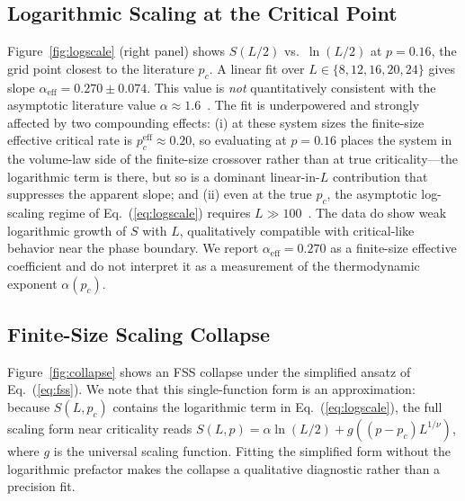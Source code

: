 \documentclass[twocolumn,prl,aps,floatfix]{revtex4-2}
\begin{document}
\subsection{Logarithmic Scaling at the Critical Point}
\label{sec:logscaling}

Figure~\ref{fig:logscale} (right panel) shows $S(L/2)$ vs.\ $\ln(L/2)$ at
$p = 0.16$, the grid point closest to the literature $p_c$.
A linear fit over $L \in \{8, 12, 16, 20, 24\}$ gives slope
$\alpha_{\mathrm{eff}} = 0.270 \pm 0.074$.
This value is \textit{not} quantitatively consistent with the asymptotic literature
value $\alpha \approx 1.6$~\cite{Li2019}.
The fit is underpowered and strongly affected by two compounding effects:
(i) at these system sizes the finite-size effective critical rate is
$p_c^{\mathrm{eff}} \approx 0.20$, so evaluating at $p = 0.16$ places the
system in the volume-law side of the finite-size crossover rather than at true
criticality---the logarithmic term is there, but so is a dominant linear-in-$L$
contribution that suppresses the apparent slope; and (ii) even at the true $p_c$,
the asymptotic log-scaling regime of Eq.~(\ref{eq:logscale}) requires
$L \gg 100$~\cite{Zabalo2020}.
The data do show weak logarithmic growth of $S$ with $L$, qualitatively
compatible with critical-like behavior near the phase boundary.
We report $\alpha_{\mathrm{eff}} = 0.270$ as a finite-size effective coefficient
and do not interpret it as a measurement of the thermodynamic exponent
$\alpha(p_c)$.

\subsection{Finite-Size Scaling Collapse}

Figure~\ref{fig:collapse} shows an FSS collapse under the simplified ansatz of
Eq.~(\ref{eq:fss}).
We note that this single-function form is an approximation: because $S(L,p_c)$
contains the logarithmic term in Eq.~(\ref{eq:logscale}), the full scaling form
near criticality reads
$S(L,p) = \alpha\ln(L/2) + g\!\left((p-p_c)L^{1/\nu}\right)$,
where $g$ is the universal scaling function.
Fitting the simplified form without the logarithmic prefactor makes the collapse
a qualitative diagnostic rather than a precision fit.
\end{document}
